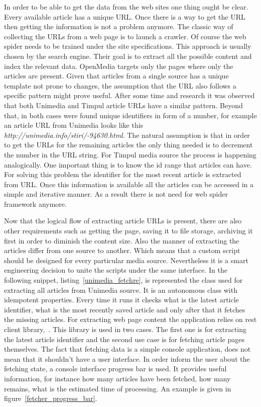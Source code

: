 In order to be able to get the data from the web sites one thing ought be clear. Every available article has a unique URL. Once there is a way to get the URL then getting the information is not a problem anymore. The classic way of collecting the URLs from a web page is to launch a crawler. Of course the web spider needs to be trained under the site specifications. This approach is usually chosen by the search engine. Their goal is to extract all the possible content and index the relevant data. OpenMedia targets only the pages where only the articles are present. Given that articles from a single source has a unique template not prone to changes, the assumption that the URL also follows a specific pattern might prove useful. After some time and research it was observed that both Unimedia and Timpul article URLs have a similar pattern. Beyond that, in both cases were found unique identifiers in form of a number, for example an article URL from Unimedia looks like this \emph{http://unimedia.info/stiri/-94630.html}. The natural assumption is that in order to get the URLs for the remaining articles the only thing needed is to decrement the number in the URL string. For Timpul media source the process is happening analogically. One important thing is to know the id range that articles can have. For solving this problem the identifier for the most recent article is extracted from URL. Once this information is available all the articles can be accessed in a simple and iterative manner. As a result there is not need for web spider framework anymore.

Now that the logical flow of extracting article URLs is present, there are also other requirements such as getting the page, saving it to file storage, archiving it first in order to diminish the content size. Also the manner of extracting the articles differ from one source to another. Which means that a custom script should be designed for every particular media source. Nevertheless it is a smart engineering decision to unite the scripts under the same interface. In the following snippet, \mbox{listing \ref{unimedia_fetchre}}, is represented the class used for extracting all articles from Unimedia source. It is an autonomous class with idempotent properties. Every time it runs it checks what is the latest article identifier, what is the most recently saved article and only after that it fetches the missing articles. For extracting web page content the application relies on rest client \mbox{library, \cite{rest_client_ruby}}. This library is used in two cases. The first one is for extracting the latest article identifier and the second use case is for fetching article pages themselves. The fact that fetching data is a simple console application, does not mean that it shouldn't have a user interface. In order inform the user about the fetching state, a console interface progress bar is used. It provides useful information, for instance how many articles have been fetched, how many remains, what is the estimated time of processing. An example is given in \mbox{figure \ref{fetcher_progress_bar}}.

